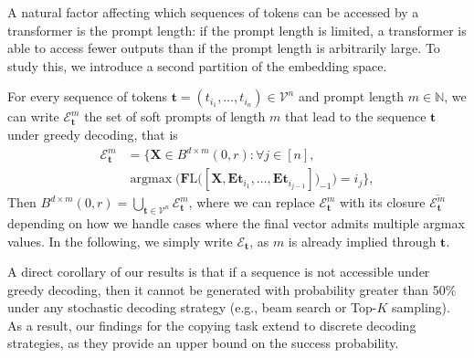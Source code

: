 A natural factor affecting which sequences of tokens can be accessed by a transformer is the prompt length: if the prompt length is limited, a transformer is able to access fewer outputs than if the prompt length is arbitrarily large. To study this, we introduce a second partition of the embedding space.


For every sequence of tokens $\mathbf t=(t_{i_1},\ldots,t_{i_n})\in\mathcal{V}^n$ and prompt length $m\in\mathbb N$, we can write $\mathcal E^m_{\mathbf t}$ the set of soft prompts of length $m$ that lead to the sequence $\mathbf t$ under greedy decoding, that is
\begin{align*}
    \mathcal E^m_{\mathbf t}&=\Bigg\{\mathbf X\in B^{d\times m}(0,r)\colon\forall j\in[n],\\&\operatorname{argmax}\bigg(\mathbf F \mathrm L \Big([\mathbf{X},\mathbf E\mathbf t_{i_1},\ldots,\mathbf E\mathbf t_{i_{j-1}}]\Big)_{-1}\bigg)={i_j}\Bigg\},
\end{align*}
Then $B^{d\times m}(0,r)=\bigcup_{\mathbf t\in\mathcal V^n}\mathcal E^m_{\mathbf t}$, where we can replace $\mathcal E^m_{\mathbf t}$ with its closure $\overline{\mathcal E^m_{\mathbf t}}$ depending on how we handle cases where the final vector admits multiple argmax values. In the following, we simply write $\mathcal E_{\mathbf t}$, as $m$ is already implied through $\mathbf t$.

\begin{remark}
    A direct corollary of our results is that if a sequence is not accessible under greedy decoding, then it cannot be generated with probability greater than 50\% under any stochastic decoding strategy (e.g., beam search or Top-$K$ sampling). As a result, our findings for the copying task extend to discrete decoding strategies, as they provide an upper bound on the success probability.
\end{remark}